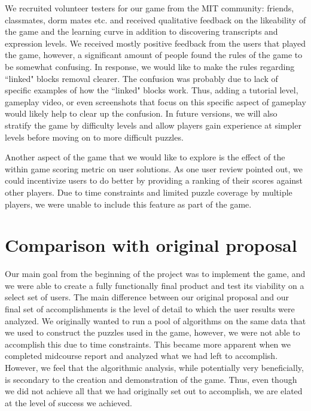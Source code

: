 \documentclass[12pt]{article}
\begin{document}
We recruited volunteer testers for our game from the MIT community: friends, classmates, dorm mates etc. and received qualitative feedback on the likeability of the game and the learning curve in addition to discovering transcripts and expression levels. We received mostly
positive feedback from the users that played the game, however, a significant amount of people found the rules of the game to be somewhat confusing. In response,
we would like to make the rules regarding ``linked" blocks removal clearer. The confusion was probably due to lack of specific examples of how the ``linked" blocks
work. Thus, adding a tutorial level, gameplay video, or even screenshots that focus on this specific aspect of gameplay would likely help to clear up the confusion. In future versions, we will also stratify the game by difficulty levels and allow players gain experience at simpler levels before moving on to more difficult puzzles. 

Another aspect of the game that we would like to explore is the effect of the within game scoring metric on user solutions. As one user review pointed out, we could incentivize users to do better by providing a ranking of their scores against other players. Due to time constraints and limited puzzle coverage by multiple players, we were unable to include this
feature as part of the game.

\section*{Comparison with original proposal}

Our main goal from the beginning of the project was to implement the game, and we were able to create a fully functionally final product and test its viability on a select set of users. The main
difference between our original proposal and our final set of accomplishments is the level of detail to which the user results were analyzed. We originally wanted to run a pool of algorithms
on the same data that we used to construct the puzzles used in the game, however, we were not able to accomplish this due to time constraints. This became more apparent when we
completed midcourse report and analyzed what we had left to accomplish. However, we feel that the
algorithmic analysis, while potentially very beneficially, is secondary to the creation and demonstration of the game. Thus, even though we did not achieve all that we had originally set out to accomplish, we are elated at the level of success we achieved.
\end{document}
